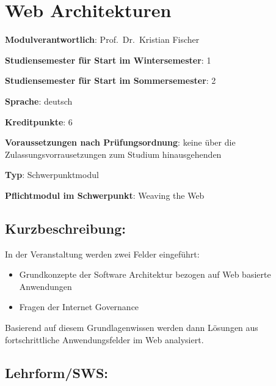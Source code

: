 \chapter{Web Architekturen}\label{web-architekturen}

\begin{modulHead}
\textbf{Modulverantwortlich}: Prof.~Dr.~Kristian
Fischer
\end{modulHead}
\begin{modulHead}
\textbf{Studiensemester für
Start im Wintersemester}:
1
\end{modulHead}
\begin{modulHead}
\textbf{Studiensemester für Start
im Sommersemester}:
2
\end{modulHead}
\begin{modulHead}
\textbf{Sprache}:
deutsch
\end{modulHead}
\begin{modulHead}
\textbf{Kreditpunkte}:
6
\end{modulHead}
\begin{modulHead}
\textbf{Voraussetzungen nach
Prüfungsordnung}: keine über die Zulassungsvorrausetzungen zum Studium
hinausgehenden
\end{modulHead}
\begin{modulHead}
\textbf{Typ}:
Schwerpunktmodul
\end{modulHead}
\begin{modulHead}
\textbf{Pflichtmodul
im Schwerpunkt}: Weaving the Web
\end{modulHead}


\section*{Kurzbeschreibung:}\label{kurzbeschreibung-14}

In der Veranstaltung werden zwei Felder eingeführt:

\begin{itemize}
\tightlist
\item
  Grundkonzepte der Software Architektur bezogen auf Web basierte
  Anwendungen
\item
  Fragen der Internet Governance
\end{itemize}

Basierend auf diesem Grundlagenwissen werden dann Lösungen aus
fortschrittliche Anwendungsfelder im Web analysiert.

\section*{Lehrform/SWS:}\label{lehrformsws-22}

